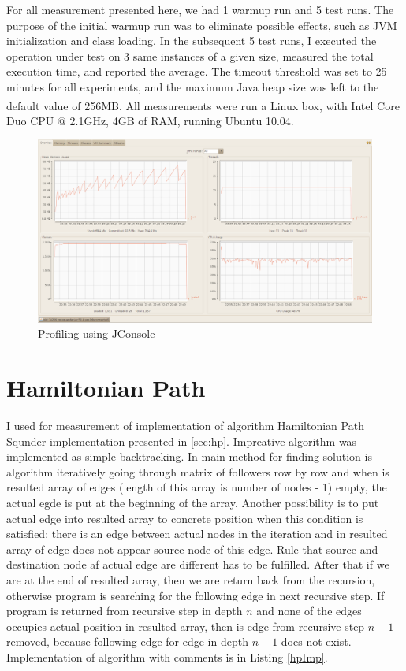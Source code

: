 \documentclass[11pt,twoside,a4paper]{book}
\begin{document}
For all measurement presented here, we had 1 warmup run and 5 test runs. The
purpose of the initial warmup run was to eliminate possible 
effects, such as JVM initialization and class loading. In the subsequent 5 test runs, I executed
the operation under test on 3 same instances of a given
size, measured the total execution time, and reported the
average. The timeout threshold was set to 25 minutes for all experiments, and
the maximum Java heap size was left to the default value of 256MB. All
measurements were run a Linux box, with Intel\textsuperscript{\textregistered}
Core Duo CPU @ 2.1GHz, 4GB of RAM, running Ubuntu 10.04.

\begin{figure}[ht]
\begin{center}
\includegraphics[width=14cm]{figures/jconsole/overview}
\caption{Profiling using JConsole}
\label{fig:pfJC}
\end{center}
\end{figure}


\section{Hamiltonian Path}

I used for measurement of implementation of algorithm Hamiltonian Path Squnder
implementation presented in \ref{sec:hp}. Impreative algorithm was implemented
as simple backtracking. In main method for finding solution is algorithm
iteratively going through matrix of followers row by row and when is resulted
array of edges (length of this array is number of nodes - 1) empty, the actual
egde is put at the beginning of the array. Another possibility is to put actual
edge into resulted array to concrete position when this condition is satisfied:
there is an edge between actual nodes in the iteration and in resulted array of
edge does not appear source node of this edge. Rule that source and destination
node af actual edge are different has to be fulfilled. After that if we are at
the end of resulted array, then we are return back from the recursion, otherwise
program is searching for the following edge in next recursive step. If program
is returned from recursive step in depth $n$ and none of the edges occupies
actual position in resulted array, then is edge from recursive step $n - 1$
removed, because following edge for edge in depth $n-1$ does not exist.
Implementation of algorithm with comments is in Listing \ref{hpImp}.
\end{document}
